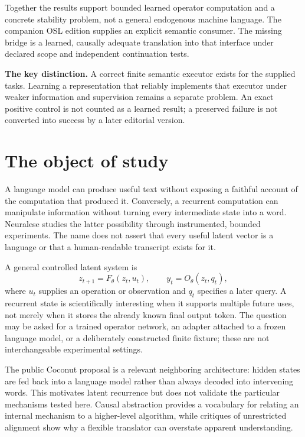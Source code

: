 \documentclass[11pt]{article}
\begin{document}
Together the results support bounded learned operator computation and a concrete stability problem, not a general endogenous machine language. The companion OSL edition supplies an explicit semantic consumer. The missing bridge is a learned, causally adequate translation into that interface under declared scope and independent continuation tests.

\begin{scopebox}
\textbf{The key distinction.} A correct finite semantic executor exists for the supplied tasks. Learning a representation that reliably implements that executor under weaker information and supervision remains a separate problem. An exact positive control is not counted as a learned result; a preserved failure is not converted into success by a later editorial version.
\end{scopebox}
\clearpage
\tableofcontents\clearpage

\section{The object of study}
A language model can produce useful text without exposing a faithful account of the computation that produced it. Conversely, a recurrent computation can manipulate information without turning every intermediate state into a word. Neuralese studies the latter possibility through instrumented, bounded experiments. The name does not assert that every useful latent vector is a language or that a human-readable transcript exists for it.

A general controlled latent system is
\begin{equation}\label{eq:latent}
 z_{t+1}=F_\theta(z_t,u_t),\qquad y_t=O_\theta(z_t,q_t),
\end{equation}
where \(u_t\) supplies an operation or observation and \(q_t\) specifies a later query. A recurrent state is scientifically interesting when it supports multiple future uses, not merely when it stores the already known final output token. The question may be asked for a trained operator network, an adapter attached to a frozen language model, or a deliberately constructed finite fixture; these are not interchangeable experimental settings.

The public Coconut proposal is a relevant neighboring architecture: hidden states are fed back into a language model rather than always decoded into intervening words. This motivates latent recurrence but does not validate the particular mechanisms tested here. Causal abstraction provides a vocabulary for relating an internal mechanism to a higher-level algorithm, while critiques of unrestricted alignment show why a flexible translator can overstate apparent understanding. \cite{coconut,causal,dilemma}
\end{document}
